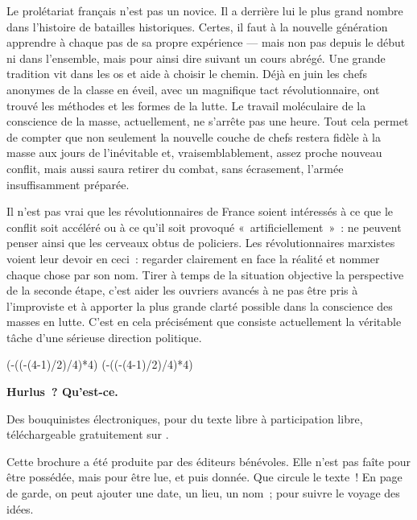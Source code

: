 \documentclass[french,twoside]{book} %
\def\truncdiv#1#2{((#1-(#2-1)/2)/#2)}
\def\moduloop#1#2{(#1-\truncdiv{#1}{#2}*#2)}
\def\modulo#1#2{\number\numexpr\moduloop{#1}{#2}\relax}
\begin{document}
Le prolétariat français n’est pas un novice. Il a derrière lui le plus grand nombre dans l’histoire de batailles historiques. Certes, il faut à la nouvelle génération apprendre à chaque pas de sa propre expérience — mais non pas depuis le début ni dans l’ensemble, mais pour ainsi dire suivant un cours abrégé. Une grande tradition vit dans les os et aide à choisir le chemin. Déjà en juin les chefs anonymes de la classe en éveil, avec un magnifique tact révolutionnaire, ont trouvé les méthodes et les formes de la lutte. Le travail moléculaire de la conscience de la masse, actuellement, ne s’arrête pas une heure. Tout cela permet de compter que non seulement la nouvelle couche de chefs restera fidèle à la masse aux jours de l’inévitable et, vraisemblablement, assez proche nouveau conflit, mais aussi saura retirer du combat, sans écrasement, l’armée insuffisamment préparée.\par
Il n’est pas vrai que les révolutionnaires de France soient intéressés à ce que le conflit soit accéléré ou à ce qu’il soit provoqué « artificiellement » : ne peuvent penser ainsi que les cerveaux obtus de policiers. Les révolutionnaires marxistes voient leur devoir en ceci : regarder clairement en face la réalité et nommer chaque chose par son nom. Tirer à temps de la situation objective la  perspective de la seconde étape, c’est aider les ouvriers avancés à ne pas être pris à l’improviste et à apporter la plus grande clarté possible dans la conscience des masses en lutte. C’est en cela précisément que consiste actuellement la véritable tâche d’une sérieuse direction politique.
 


\ifbooklet
  \pagestyle{empty}
  \clearpage
  \ifnum\modulo{\value{page}}{4}=0 \hbox{}\newpage\hbox{}\newpage\fi
  \ifnum\modulo{\value{page}}{4}=1 \hbox{}\newpage\hbox{}\newpage\fi


  \hbox{}\newpage
  \ifodd\value{page}\hbox{}\newpage\fi
  {\centering\color{rubric}\bfseries\noindent\large
    Hurlus ? Qu’est-ce.\par
    \bigskip
  }
  \noindent Des bouquinistes électroniques, pour du texte libre à participation libre,
  téléchargeable gratuitement sur \href{https://hurlus.fr}{}.\par
  \bigskip
  \noindent Cette brochure a été produite par des éditeurs bénévoles.
  Elle n’est pas faîte pour être possédée, mais pour être lue, et puis donnée.
  Que circule le texte !
  En page de garde, on peut ajouter une date, un lieu, un nom ; pour suivre le voyage des idées.
  \par
\end{document}
